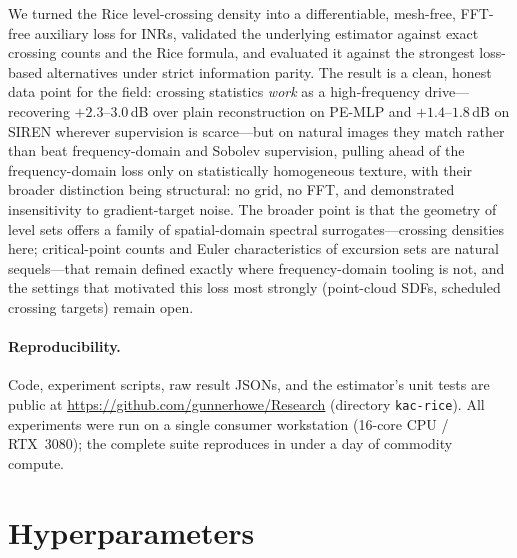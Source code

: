 \documentclass[10pt]{article}
\begin{document}
We turned the Rice level-crossing density into a differentiable, mesh-free,
FFT-free auxiliary loss for INRs, validated the underlying estimator against exact
crossing counts and the Rice formula, and evaluated it against the strongest loss-based
alternatives under strict information parity. The result is a clean, honest data
point for the field: crossing statistics \emph{work} as a high-frequency drive---%
recovering $+2.3$--$3.0$\,dB over plain reconstruction on PE-MLP and
$+1.4$--$1.8$\,dB on SIREN wherever supervision is scarce---but on natural images they
match rather than beat
frequency-domain and Sobolev supervision, pulling ahead of the frequency-domain loss
only on statistically homogeneous texture, with their broader distinction being
structural: no grid, no FFT, and demonstrated insensitivity to gradient-target noise. The broader point is
that the geometry of level sets offers a family of spatial-domain spectral
surrogates---crossing densities here; critical-point counts and Euler characteristics
of excursion sets \citep{adler2007random} are natural sequels---that remain defined
exactly where frequency-domain tooling is not, and the settings that motivated this
loss most strongly (point-cloud SDFs, scheduled crossing targets) remain open.

\paragraph{Reproducibility.} Code, experiment scripts, raw result JSONs, and the
estimator's unit tests are public at
\url{https://github.com/gunnerhowe/Research} (directory \texttt{kac-rice}). All
experiments were run on a single consumer workstation (16-core CPU / RTX~3080); the
complete suite reproduces in under a day of commodity compute.




\appendix

\section{Hyperparameters}
\label{app:hyper}
\end{document}
